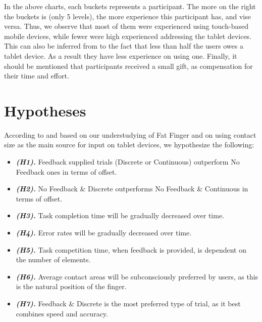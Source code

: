 In the above charts, each buckets represents a participant. The more on the right the buckets is (only 5 levels), the more experience this participant has, and vise versa. Thus, we observe that most of them were experienced using touch-based mobile devices, while fewer were high experienced addressing the tablet devices. This can also be inferred from to the fact that less than half the users owes a tablet device. As a result they have less experience on using one. Finally, it should be mentioned that participants received a small gift, as compensation for their time and effort.




\section{Hypotheses}
\label{sec:hypotheses}

According to and based on our understudying of Fat Finger and on using contact size as the main source for input on tablet devices, we hypothesize the following:

\begin{itemize}
	\item \textbf{\textit{(H1).}} Feedback supplied trials (Discrete or Continuous) outperform No Feedback ones in terms of offset.
	\item \textbf{\textit{(H2).}} No Feedback \& Discrete outperforms No Feedback \& Continuous in terms of offset.
	\item \textbf{\textit{(H3).}} Task completion time will be gradually decreased over time.
	\item \textbf{\textit{(H4).}} Error rates will be gradually decreased over time.
	\item \textbf{\textit{(H5).}} Task competition time, when feedback is provided, is dependent on the number of elements.
	\item \textbf{\textit{(H6).}} Average contact areas will be subconsciously preferred by users, as this is the natural position of the finger.
	\item \textbf{\textit{(H7).}} Feedback \& Discrete is the most preferred type of trial, as it best combines speed and accuracy.
\end{itemize}




